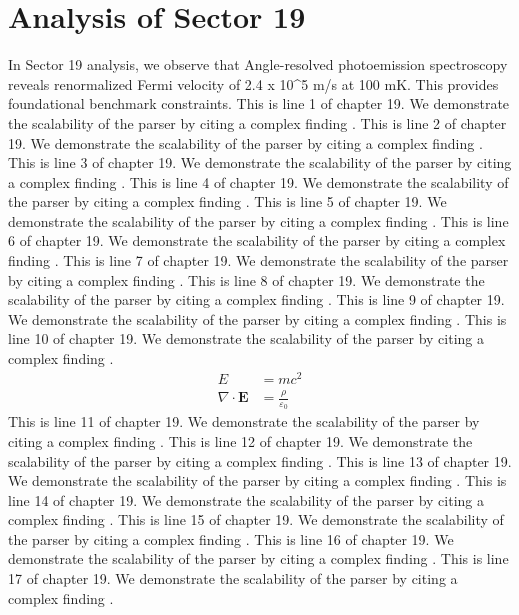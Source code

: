 \chapter{Analysis of Sector 19}

In Sector 19 analysis, we observe that Angle-resolved photoemission spectroscopy reveals renormalized Fermi velocity of 2.4 x 10^5 m/s at 100 mK. This provides foundational benchmark constraints.
This is line 1 of chapter 19. We demonstrate the scalability of the parser by citing a complex finding \cite{ref19_1}.
This is line 2 of chapter 19. We demonstrate the scalability of the parser by citing a complex finding \cite{ref19_2}.
This is line 3 of chapter 19. We demonstrate the scalability of the parser by citing a complex finding \cite{ref19_3}.
This is line 4 of chapter 19. We demonstrate the scalability of the parser by citing a complex finding \cite{ref19_4}.
This is line 5 of chapter 19. We demonstrate the scalability of the parser by citing a complex finding \cite{ref19_5}.
This is line 6 of chapter 19. We demonstrate the scalability of the parser by citing a complex finding \cite{ref19_6}.
This is line 7 of chapter 19. We demonstrate the scalability of the parser by citing a complex finding \cite{ref19_7}.
This is line 8 of chapter 19. We demonstrate the scalability of the parser by citing a complex finding \cite{ref19_8}.
This is line 9 of chapter 19. We demonstrate the scalability of the parser by citing a complex finding \cite{ref19_9}.
This is line 10 of chapter 19. We demonstrate the scalability of the parser by citing a complex finding \cite{ref19_10}.
\begin{align*}
  E &= mc^2 \\
  \nabla \cdot \mathbf{E} &= \frac{\rho}{\varepsilon_0}
\end{align*}
This is line 11 of chapter 19. We demonstrate the scalability of the parser by citing a complex finding \cite{ref19_11}.
This is line 12 of chapter 19. We demonstrate the scalability of the parser by citing a complex finding \cite{ref19_12}.
This is line 13 of chapter 19. We demonstrate the scalability of the parser by citing a complex finding \cite{ref19_13}.
This is line 14 of chapter 19. We demonstrate the scalability of the parser by citing a complex finding \cite{ref19_14}.
This is line 15 of chapter 19. We demonstrate the scalability of the parser by citing a complex finding \cite{ref19_15}.
This is line 16 of chapter 19. We demonstrate the scalability of the parser by citing a complex finding \cite{ref19_16}.
This is line 17 of chapter 19. We demonstrate the scalability of the parser by citing a complex finding \cite{ref19_17}.
